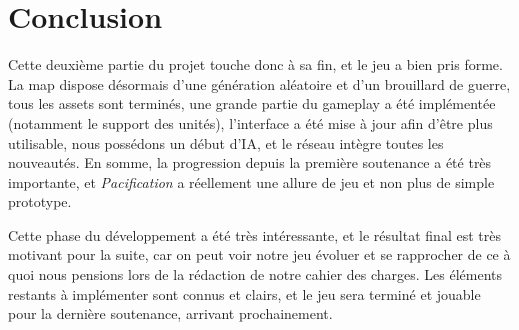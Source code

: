 \documentclass[12pt]{report}
\begin{document}
\chapter{Conclusion}

Cette deuxième partie du projet touche donc à sa fin, et le jeu a bien pris
forme. La map dispose désormais d’une génération aléatoire et d’un brouillard de
guerre, tous les assets sont terminés, une grande partie du gameplay a été
implémentée (notamment le support des unités), l’interface a été mise à jour
afin d’être plus utilisable, nous possédons un début d’IA, et le réseau intègre
toutes les nouveautés. En somme, la progression depuis la première soutenance a
été très importante, et \textit{Pacification} a réellement une allure de jeu et
non plus de simple prototype.

Cette phase du développement a été très intéressante, et le résultat final est
très motivant pour la suite, car on peut voir notre jeu évoluer et se
rapprocher de ce à quoi nous pensions lors de la rédaction de notre cahier des
charges. Les éléments restants à implémenter sont connus et clairs, et le jeu
sera terminé et jouable pour la dernière soutenance, arrivant prochainement.
\end{document}
